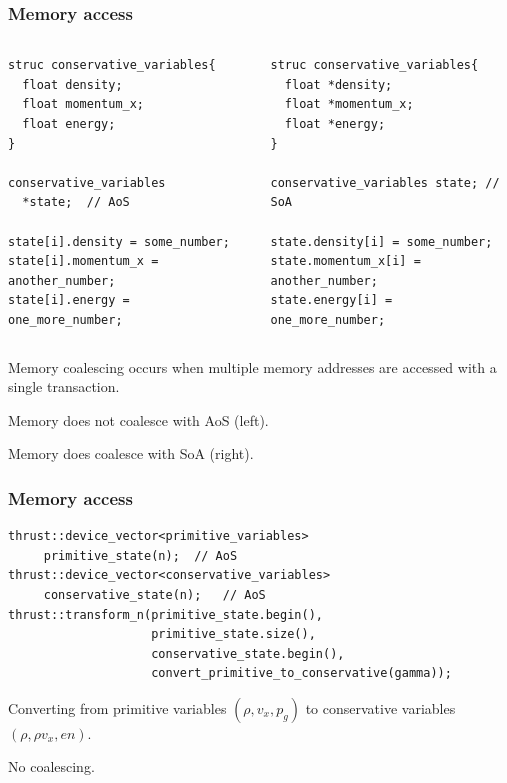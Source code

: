 \documentclass{beamer}
\begin{document}
\begin{frame}[fragile]
\frametitle{Memory access}
\begin{columns}
\begin{column}{0.5\textwidth}
\begin{lstlisting}
struc conservative_variables{
  float density;
  float momentum_x;
  float energy;
}

conservative_variables 
  *state;  // AoS

state[i].density = some_number;
state[i].momentum_x = another_number;
state[i].energy = one_more_number;
\end{lstlisting} 
\end{column}
\begin{column}{0.5\textwidth}
\begin{lstlisting}
struc conservative_variables{
  float *density;
  float *momentum_x;
  float *energy;
}

conservative_variables state; // SoA

state.density[i] = some_number;
state.momentum_x[i] = another_number;
state.energy[i] = one_more_number;
\end{lstlisting} 
\end{column}
\end{columns}
\bei
\item Memory coalescing occurs when multiple memory addresses are accessed with a single transaction.
\item Memory does not coalesce with AoS (left).
\item Memory does coalesce with SoA (right).
\ebi
\end{frame}

\begin{frame}[fragile]
\frametitle{Memory access}
\begin{lstlisting}
thrust::device_vector<primitive_variables>    
     primitive_state(n);  // AoS
thrust::device_vector<conservative_variables> 
     conservative_state(n);   // AoS
thrust::transform_n(primitive_state.begin(),
                    primitive_state.size(),
                    conservative_state.begin(),
                    convert_primitive_to_conservative(gamma));
\end{lstlisting} 
\bei
\item Converting from primitive variables $(\rho,v_x, p_g)$ to conservative variables $(\rho,\rho v_x, en)$.
\item No coalescing.
\ebi
\end{frame}
\end{document}
